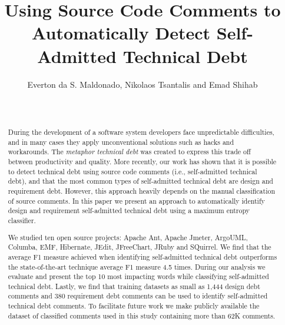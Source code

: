 \documentclass{sig-alternate}
\newcommand{\SATD}{self-admitted technical debt\xspace}
\begin{document}

\title{Using Source Code Comments to Automatically Detect Self-Admitted Technical Debt}

\author{
\alignauthor 
       Everton da S. Maldonado, Nikolaos Tsantalis and Emad Shihab\\
       \\
       \\
}

\maketitle
\begin{abstract}
During the development of a software system developers face unpredictable difficulties, and in many cases they apply unconventional solutions such as hacks and workarounds. The \textit{metaphor technical debt} was created to express this trade off between productivity and quality. More recently, our work has shown that it is possible to detect technical debt using source code comments (i.e., self-admitted technical debt), and that the most common types of self-admitted technical debt are design and requirement debt. However, this approach heavily depends on the manual classification of source comments. In this paper we present an approach to automatically identify design and requirement \SATD using a maximum entropy classifier. 

We studied ten open source projects: Apache Ant, Apache Jmeter, ArgoUML, Columba, EMF, Hibernate, JEdit, JFreeChart, JRuby and SQuirrel. We find that the average F1 measure achieved when identifying \SATD outperforms the state-of-the-art technique average F1 measure 4.5 times. During our analysis we evaluate and present the top 10 most impacting words while classifying \SATD. Lastly, we find that training datasets as small as 1,444 design debt comments and 380 requirement debt comments can be used to identify \SATD comments. To facilitate future work we make publicly available the dataset of classified comments used in this study containing more than 62K comments. 
\end{abstract}
\end{document}
